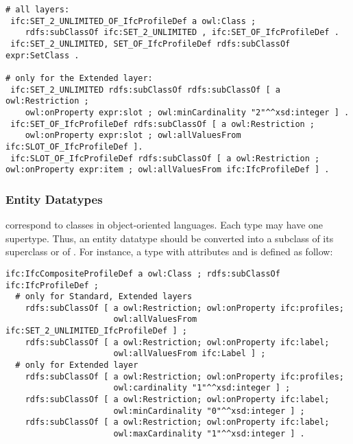 \begin{lstlisting}
# all layers:
 ifc:SET_2_UNLIMITED_OF_IfcProfileDef a owl:Class ;
    rdfs:subClassOf ifc:SET_2_UNLIMITED , ifc:SET_OF_IfcProfileDef .
 ifc:SET_2_UNLIMITED, SET_OF_IfcProfileDef rdfs:subClassOf expr:SetClass .

# only for the Extended layer:
 ifc:SET_2_UNLIMITED rdfs:subClassOf rdfs:subClassOf [ a owl:Restriction ;
    owl:onProperty expr:slot ; owl:minCardinality "2"^^xsd:integer ] .
 ifc:SET_OF_IfcProfileDef rdfs:subClassOf [ a owl:Restriction ;
    owl:onProperty expr:slot ; owl:allValuesFrom ifc:SLOT_OF_IfcProfileDef ].
 ifc:SLOT_OF_IfcProfileDef rdfs:subClassOf [ a owl:Restriction ; owl:onProperty expr:item ; owl:allValuesFrom ifc:IfcProfileDef ] .
\end{lstlisting}




\subsubsection{Entity Datatypes} correspond to classes in object-oriented languages. Each type may have one super\-type. Thus, an entity data\-type should be converted into a subclass of its super\-class or of . For instance, a type with attributes  and  is defined as follow:

\begin{lstlisting}
ifc:IfcCompositeProfileDef a owl:Class ; rdfs:subClassOf ifc:IfcProfileDef ;
  # only for Standard, Extended layers
    rdfs:subClassOf [ a owl:Restriction; owl:onProperty ifc:profiles;
                      owl:allValuesFrom ifc:SET_2_UNLIMITED_IfcProfileDef ] ;
    rdfs:subClassOf [ a owl:Restriction; owl:onProperty ifc:label;
                      owl:allValuesFrom ifc:Label ] ;
  # only for Extended layer
    rdfs:subClassOf [ a owl:Restriction; owl:onProperty ifc:profiles;
                      owl:cardinality "1"^^xsd:integer ] ;
    rdfs:subClassOf [ a owl:Restriction; owl:onProperty ifc:label;
                      owl:minCardinality "0"^^xsd:integer ] ;
    rdfs:subClassOf [ a owl:Restriction; owl:onProperty ifc:label;
                      owl:maxCardinality "1"^^xsd:integer ] .
\end{lstlisting}

